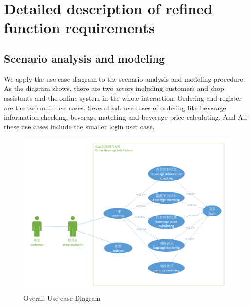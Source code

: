 \documentclass[a4paper]{report}
\begin{document}
\section{Detailed description of refined function requirements}

\subsection{Scenario analysis and modeling}
We apply the use case diagram to the scenario analysis and modeling procedure. As the diagram shows, there are two actors including customers and shop assistants and the online  system in the whole interaction. Ordering and register are the  two main use cases. Several sub use cases of ordering like beverage information checking, beverage matching and beverage price calculating. And All these use cases include the smaller login user case.
\begin{figure}[hbtp]
  \centering
  \includegraphics[scale=0.43]{useCase.pdf}
  \caption{Overall Use-case Diagram}\label{1}
\end{figure}
\end{document}
